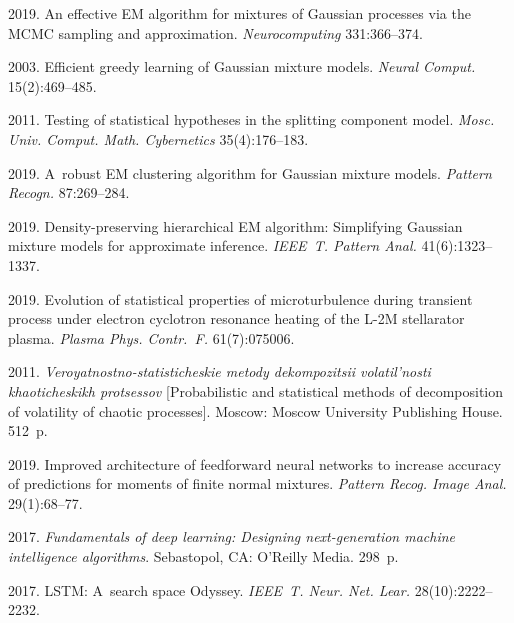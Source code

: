 \begin{multicols}{2}
{{\begin{thebibliography}{99}
 2019. An effective EM algorithm for mixtures 
of Gaussian processes via the MCMC sampling and approximation. 
 \textit{Neurocomputing} 331:366--374.

2003. Efficient greedy learning of Gaussian mixture models. 
 \textit{Neural Comput.} 15(2):469--485.

 2011. Testing of statistical hypotheses in the 
splitting component model.  \textit{Mosc. Univ. Comput. Math. 
Cybernetics} 35(4):176--183.

2019. A~robust EM clustering algorithm for Gaussian mixture models. 
 \textit{Pattern Recogn.} 87:269--284.

 2019. 
Density-preserving hierarchical EM algorithm: Simplifying Gaussian 
mixture models for approximate inference. 
 \textit{IEEE~T. Pattern Anal.} 41(6):1323--1337.

  2019. Evolution of statistical properties 
of microturbulence during transient process under electron cyclotron resonance 
heating of the L-2M stellarator plasma. 
 \textit{Plasma Phys. Contr.~F.} 61(7):075006.

 2011.  \textit{Veroyatnostno-statisticheskie metody dekompozitsii 
volatil'nosti khaoticheskikh protsessov} 
[Probabilistic and statistical methods of decomposition 
of volatility of chaotic processes]. Moscow: Moscow University Publishing House. 512~p.

 2019. Improved architecture of feedforward neural networks to increase accuracy 
 of predictions for moments of finite normal mixtures. 
  \textit{Pattern Recog. Image Anal.} 29(1):68--77.

 2017. \textit{Fundamentals of deep learning: 
Designing next-generation machine intelligence algorithms}. 
 Sebastopol, CA: O'Reilly Media. 298~p.

  2017. LSTM: A~search space Odyssey. 
 \textit{IEEE~T. Neur. Net. Lear.} 28(10):2222--2232.


\end{thebibliography}}}
\end{multicols}
